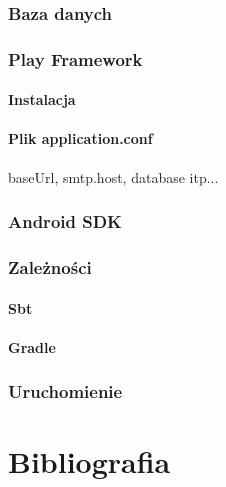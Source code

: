\documentclass[11pt]{aghdpl}
\begin{document}
\subsection{Baza danych}
\subsection{Play Framework}
\subsubsection{Instalacja}
\subsubsection{Plik application.conf}
baseUrl, smtp.host, database itp...
\subsection{Android SDK}
\subsection{Zależności}
\subsubsection{Sbt}
\subsubsection{Gradle}
\subsection{Uruchomienie}

% 
% 

\chapter{Bibliografia} %
\label{cha:bibliografia}



%
%
%
%
\end{document}
